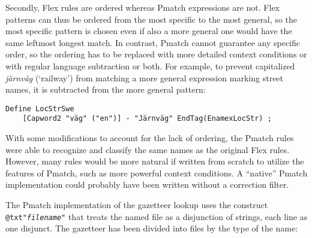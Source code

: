 \documentclass{llncs}
\begin{document}
Secondly, Flex rules are ordered whereas Pmatch expressions are not.
Flex patterns can thus be ordered from the most
specific to the most general, so the most specific pattern is
chosen even if also a more general one would have the same
leftmost longest match. In contrast,
Pmatch cannot guarantee any specific order, so the ordering has to be
replaced with more detailed context conditions or with regular language
subtraction or both. For example, to prevent capitalized
\textit{järnväg} (`railway') from matching a more general expression
marking street names, it is subtracted from the more general pattern:
%
\begin{verbatim}
Define LocStrSwe
    [Capword2 "väg" ("en")] - "Järnväg" EndTag(EnamexLocStr) ;
\end{verbatim}

With some modifications to account for the lack of ordering, the
Pmatch rules were able to recognize and classify the same names as the
original Flex rules. However, many rules would be more natural if
written from scratch to utilize the features of Pmatch, such as
more powerful context conditions. A ``native'' Pmatch implementation
could probably have been written without a correction filter.



\begin{sloppypar}
The Pmatch implementation of the gazetteer lookup uses the construct
\texttt{@txt"\textit{filename}"} that treats the named file as a
disjunction of strings, each line as one disjunct. The gazetteer has
been divided into files by the type of the name:
\end{sloppypar}
\end{document}
